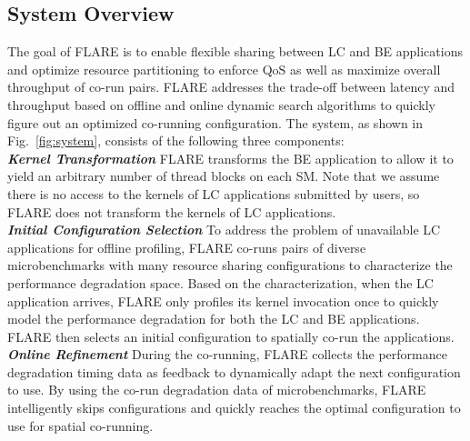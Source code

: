 	\subsection{System Overview}
		The goal of FLARE is to enable flexible sharing between LC and BE applications 
        and optimize resource partitioning 
        to enforce QoS as well as maximize overall throughput 
        of co-run pairs. %
        FLARE addresses the trade-off between latency and throughput 
        based on offline and online dynamic search algorithms to quickly figure out an optimized co-running configuration. The system, as shown in Fig.~\ref{fig:system}, consists of the following three components: \\%
		\textbf{\textit{Kernel Transformation}} FLARE transforms the BE application 
        to allow it to yield an arbitrary number of thread blocks on each SM. 
        Note that we assume there is no access to the kernels of LC applications 
        submitted by users, so FLARE does not transform the kernels of LC applications.\\
		 \textbf{\textit{Initial Configuration Selection}} To address the problem of unavailable LC applications for offline profiling, FLARE co-runs pairs of diverse microbenchmarks with many resource sharing configurations to characterize the performance degradation space. Based on the characterization, when the LC application arrives, FLARE only profiles its kernel invocation once to quickly model the performance degradation for both the LC and BE applications. FLARE then selects an initial configuration to spatially co-run the applications. \\
		\textbf{\textit{Online Refinement}} During the co-running, FLARE collects the performance degradation timing data as feedback to dynamically adapt the next configuration to use. By using the co-run degradation data of microbenchmarks, FLARE intelligently skips configurations and quickly reaches the optimal configuration to use for spatial co-running.
